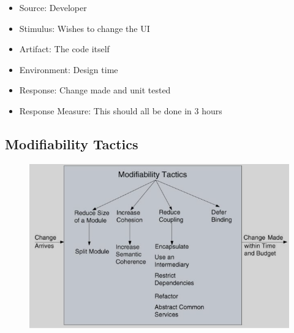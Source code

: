 \documentclass[a4paper]{article}
\begin{document}
\begin{itemize}
\item Source: Developer
\item Stimulus: Wishes to change the UI
\item Artifact: The code itself
\item Environment: Design time
\item Response: Change made and unit tested
\item Response Measure: This should all be done in 3 hours
\end{itemize}

\subsection{Modifiability Tactics}
\begin{figure}[H]
\centering 
\includegraphics[scale=0.6]{images/modifiability-tactics.png}
\end{figure}
\end{document}
